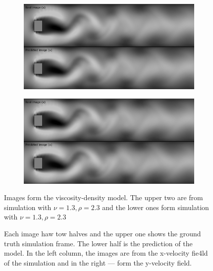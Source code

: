 \documentclass{llncs}
\begin{document}
\begin{figure}
  \begin{subfigure}{.5\textwidth}
    \centering
    \includegraphics[width=1\linewidth]{imgs/single_fluid_x_2}  
  \end{subfigure}
  \begin{subfigure}{.5\textwidth}
    \centering
    \includegraphics[width=1\linewidth]{imgs/single_fluid_y_2}
  \end{subfigure}

  \begin{center}
  Images form the viscosity-density model. The upper two are from simulation with $\nu=1.3, \rho=2.3$ and the lower ones form simulation with $\nu=1.3, \rho=2.3$
  \end{center}

  \caption{Each image haw tow halves and the upper one shows the ground truth simulation frame. The lower half is the prediction of the model. In the left column, the images are from the x-velocity fie4ld of the simulation and in the right --- form the y-velocity field.}
\end{figure}
\end{document}
